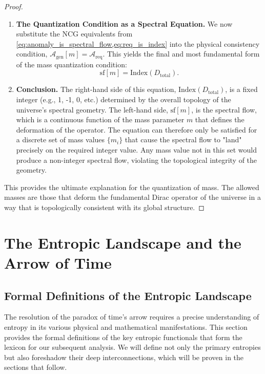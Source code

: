 \documentclass[11pt, letterpaper]{report}
\theoremstyle{plain} %
\theoremstyle{definition} %
\theoremstyle{remark} %
\newcommand{\Index}{\text{Index}}
\begin{document}
\begin{proof}
\begin{enumerate}
    \item \textbf{The Quantization Condition as a Spectral Equation.}
    We now substitute the NCG equivalents from \cref{eq:anomaly_is_spectral_flow,eq:req_is_index} into the physical consistency condition, $\mathcal{A}_{\text{gen}}[m] = \mathcal{A}_{\text{req}}$. This yields the final and most fundamental form of the mass quantization condition:
    \begin{equation}
        \boxed{\text{sf}[m] = \Index(D_{\text{total}})}.
        \label{eq:spectral_quantization_condition}
    \end{equation}

    \item \textbf{Conclusion.} The right-hand side of this equation, $\Index(D_{\text{total}})$, is a fixed integer (e.g., 1, -1, 0, etc.) determined by the overall topology of the universe's spectral geometry. The left-hand side, $\text{sf}[m]$, is the spectral flow, which is a continuous function of the mass parameter $m$ that defines the deformation of the operator. The equation can therefore only be satisfied for a discrete set of mass values $\{m_i\}$ that cause the spectral flow to "land" precisely on the required integer value. Any mass value not in this set would produce a non-integer spectral flow, violating the topological integrity of the geometry.
\end{enumerate}
This provides the ultimate explanation for the quantization of mass. The allowed masses are those that deform the fundamental Dirac operator of the universe in a way that is topologically consistent with its global structure.
\end{proof}












\chapter{The Entropic Landscape and the Arrow of Time}
\label{chap:entropic_arrow_of_time}

\section{Formal Definitions of the Entropic Landscape}
\label{sec:entropy_lexicon}

The resolution of the paradox of time's arrow requires a precise understanding of entropy in its various physical and mathematical manifestations. This section provides the formal definitions of the key entropic functionals that form the lexicon for our subsequent analysis. We will define not only the primary entropies but also foreshadow their deep interconnections, which will be proven in the sections that follow.
\end{document}
